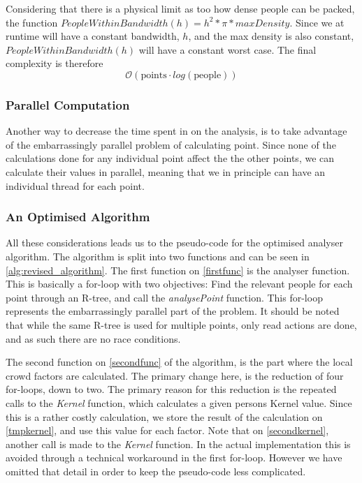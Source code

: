 Considering that there is a physical limit as too how dense people can be packed, the function $PeopleWithinBandwidth(h) = h^2 * \pi * maxDensity$. Since we at runtime will have a constant bandwidth, $h$, and the max density is also constant, $PeopleWithinBandwidth(h)$ will have a constant worst case. The final complexity is therefore $$\mathcal{O}(\text{points} \cdot log(\text{people}))$$

\subsubsection{Parallel Computation}

Another way to decrease the time spent in on the analysis, is to take advantage of the embarrassingly parallel problem of calculating point. Since none of the calculations done for any individual point affect the the other points, we can calculate their values in parallel, meaning that we in principle can have an individual thread for each point.

\subsubsection{An Optimised Algorithm}
All these considerations leads us to the pseudo-code for the optimised analyser algorithm. The algorithm is split into two functions and can be seen in \cref{alg:revised_algorithm}. The first function on \cref{firstfunc} is the analyser function. This is basically a for-loop with two objectives: Find the relevant people for each point through an R-tree, and call the \emph{analysePoint} function. This for-loop represents the embarrassingly parallel part of the problem. It should be noted that while the same R-tree is used for multiple points, only read actions are done, and as such there are no race conditions.

The second function on \cref{secondfunc} of the algorithm, is the part where the local crowd factors are calculated. The primary change here, is the reduction of four for-loops, down to two. The primary reason for this reduction is the repeated calls to the \emph{Kernel} function, which calculates a given persons Kernel value. Since this is a rather costly calculation, we store the result of the calculation on \cref{tmpkernel}, and use this value for each factor. Note that on \cref{secondkernel}, another call is made to the \emph{Kernel} function. In the actual implementation this is avoided through a technical workaround in the first for-loop. However we have omitted that detail in order to keep the pseudo-code less complicated.

